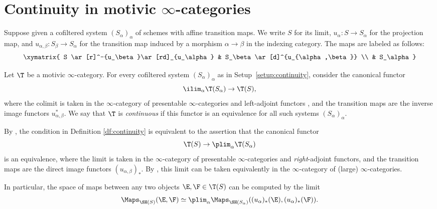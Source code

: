 \appendix
\section{Continuity in motivic \texorpdfstring{$\infty$}{∞}-categories}
\label{apd:continuity}

\begin{setup}\label{setup:continuity}
Suppose given a cofiltered system $(S_\alpha)_\alpha$ of schemes with affine transition maps.
We write $S$ for its limit, $u_\alpha : S \to S_\alpha$ for the projection map, and $u_{\alpha,\beta} : S_\beta \to S_\alpha$ for the transition map induced by a morphism $\alpha \to \beta$ in the indexing category. The maps are labeled as follows:
\[
\xymatrix{
S \ar[r]^-{u_\beta}\ar[rd]_{u_\alpha}
& S_\beta \ar[d]^{u_{\alpha,\beta}}
\\
& S_\alpha
}
\]
\end{setup}

\begin{df}\label{df:continuity}
Let $\T$ be a motivic $\infty$-category.
For every cofiltered system $(S_\alpha)_\alpha$ as in Setup~\ref{setup:continuity}, consider the canonical functor
\[
\ilim_\alpha \T(S_\alpha) \to \T(S),
\]
where the colimit is taken in the $\infty$-category of presentable $\infty$-categories and left-adjoint functors \cite[Def.\,5.5.3.1]{LurieHTT}, and the transition maps are the inverse image functors $u_{\alpha,\beta}^*$.
We say that $\T$ is \emph{continuous} if this functor is an equivalence for all such systems $(S_\alpha)_\alpha$.
\end{df}

\begin{num}\label{num:continuity lower star}
By \cite[Cor.\,5.5.3.4]{LurieHTT}, the condition in Definition \ref{df:continuity} is equivalent to the assertion that the canonical functor
\[
\T(S) \to \plim_\alpha \T(S_\alpha)
\]
is an equivalence, where the limit is taken in the $\infty$-category of presentable $\infty$-categories and \emph{right}-adjoint functors, and the transition maps are the direct image functors $(u_{\alpha,\beta})_*$.
By \cite[Th.\,5.5.3.18]{LurieHTT}, this limit can be taken equivalently in the $\infty$-category of (large) $\infty$-categories.

In particular, the space of maps between any two objects $\E,\F \in \T(S)$ can be computed by the limit
\[
\Maps_{\SH(S)}(\E, \F)
\simeq \plim_\alpha \Maps_{\SH(S_\alpha)}((u_\alpha)_*(\E), (u_\alpha)_*(\F)).
\]
\end{num}

